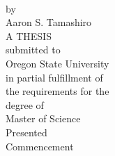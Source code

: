 
\thispagestyle{empty}

\setlength{\baselineskip}{21pt}

\begin{center}
{
   \myTitleName
\\ \vspace{0.25in}
   by
\\ \vspace{0.25in}
   Aaron S. Tamashiro
\\ \vspace{1.0in}
   A THESIS
\\ \vspace{0.25in}
   submitted to
\\ \vspace{0.25in}
   Oregon State University
\\ \vspace{1.0in}
   in partial fulfillment of
\\
   the requirements for the
\\
   degree of
\\ \vspace{0.25in}
   Master of Science
\\ \vspace{1.0in}
   Presented \myDefenseDate
\\ 
   Commencement \myCommenceDate
}
\end{center}

\addtolength{\baselineskip}{-7pt}


